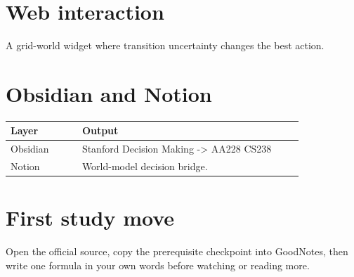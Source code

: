 \documentclass[11pt]{article}
\begin{document}
\section*{Web interaction}
A grid-world widget where transition uncertainty changes the best action.

\section*{Obsidian and Notion}
\begin{tabular}{p{0.22\linewidth}p{0.68\linewidth}}
\toprule
Layer & Output \\
\midrule
Obsidian & Stanford Decision Making -> AA228 CS238 \\
Notion & World-model decision bridge. \\
\bottomrule
\end{tabular}

\section*{First study move}
Open the official source, copy the prerequisite checkpoint into GoodNotes, then write one formula in your own words before watching or reading more.
\end{document}
